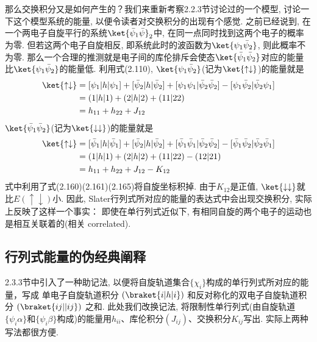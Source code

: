 那么交换积分又是如何产生的？我们来重新考察2.2.3节讨论过的一个模型, 
讨论一下这个模型系统的能量, 
以便令读者对交换积分的出现有个感觉. 
之前已经说到, 
在一个两电子自旋平行的系统$\ket{\bar{\psi}_1\bar{\psi}}_2$中, 
在同一点同时找到这两个电子的概率为零. 
但若这两个电子自旋相反, 
即系统此时的波函数为$\ket{{\psi}_1\bar{\psi}_2}$, 
则此概率不为零. 
那么一个合理的推测就是电子间的库伦排斥会使态$\ket{\bar{\psi}_1\bar{\psi}_2}$对应的能量比$\ket{\psi_1\bar{\psi}_2}$的能量低. 
利用式(2.110), 
$\ket{\psi_1\bar{\psi}_2}$(记为$\ket{\uparrow\downarrow}$)的能量就是
\begin{align}
\ket{\uparrow\downarrow} & =[\psi_1|h|\psi_1] + [\bar{\psi}_2|h|\bar{\psi}_2] + [\psi_1\psi_1|\bar{\psi}_2\bar{\psi}_2] - [\psi_1\bar{\psi}_2|\bar{\psi}_2\psi_1]\notag\\
& = (1|h|1) + (2|h|2) + (11|22)\notag\\
& = h_{11} + h_{22} + J_{12}
\end{align}
$\ket{\bar{\psi}_1\bar{\psi}_2}$(记为$\ket{\downarrow\downarrow}$)的能量就是
\begin{align}
\ket{\uparrow\downarrow} & =[\bar{\psi}_1|h|\bar{\psi}_1] + [\bar{\psi}_2|h|\bar{\psi}_2] + [\bar{\psi}_1\bar{\psi}_1|\bar{\psi}_2\bar{\psi}_2] - [\bar{\psi}_1\bar{\psi}_2|\bar{\psi}_2\bar{\psi}_1]\notag\\
& = (1|h|1) + (2|h|2) + (11|22) - (12|21)\notag\\
& = h_{11} + h_{22} + J_{12} - K_{12}
\end{align}
式中利用了式(2.160)(2.161)(2.165)将自旋坐标积掉. 
由于$K_{12}$是正值, 
$\ket{\downarrow\downarrow}$就比$E(\uparrow\downarrow)$小. 
因此, 
Slater行列式所对应的能量的表达式中会出现交换积分, 
实际上反映了这样一个事实： 即使在单行列式近似下, 
有相同自旋的两个电子的运动也是相互关联着的(相关 correlated).

\subsection{行列式能量的伪经典阐释}
\label{sec2.3.7}
2.3.3节中引入了一种助记法, 
以便将自旋轨道集合$\{\chi_i\}$构成的单行列式所对应的能量，写成
单电子自旋轨道积分 $(\braket{i|h|i})$ 和反对称化的双电子自旋轨道积分 $(\braket{ij||ij})$ 之和. 
此处我们改换记法, 
将限制性单行列式(由自旋轨道$\{ \psi_i\alpha \}$和$\{ \psi_i\beta \}$构成)的能量用$h_{ii}$、库伦积分$(J_{ij})$、交换积分$K_{ij}$写出. 
实际上两种写法都很方便.

